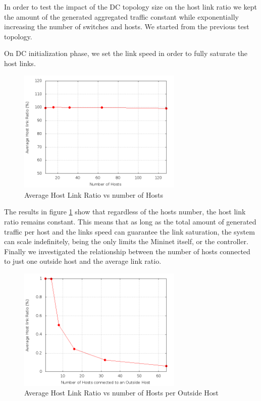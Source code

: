 \documentclass[12pt,english,oneside]{book}
\begin{document}
In order to test the impact of the DC topology size on the
host link ratio we kept the amount of the generated aggregated traffic 
constant while exponentially increasing the number of switches and hosts.
We started from the previous test topology.

On DC initialization phase, we set the link speed in order to fully saturate the host links.

\begin{figure}[h!tbp]
        \centering
        \includegraphics[width=0.7\textwidth]{figures/topo.png}
        \caption{Average Host Link Ratio vs number of Hosts}
        \label{fig:topo}
\end{figure}

The results in figure \ref{fig:topo} show that regardless of the hosts number, the host link ratio remains constant.
This means that as long as the total amount of generated traffic per host and the links speed can guarantee the link saturation, the system can scale indefinitely, being the only limits the Mininet itself, or the controller. 
Finally we investigated the relationship between the number of hosts connected to just one outside host and the average link ratio.

\newpage

\begin{figure}[h!tbp]
        \centering
        \includegraphics[width=0.7\textwidth]{figures/out_hosts_ratio.png}
        \caption{Average Host Link Ratio vs number of Hosts per Outside Host}
        \label{fig:hosts}
\end{figure}
\end{document}
